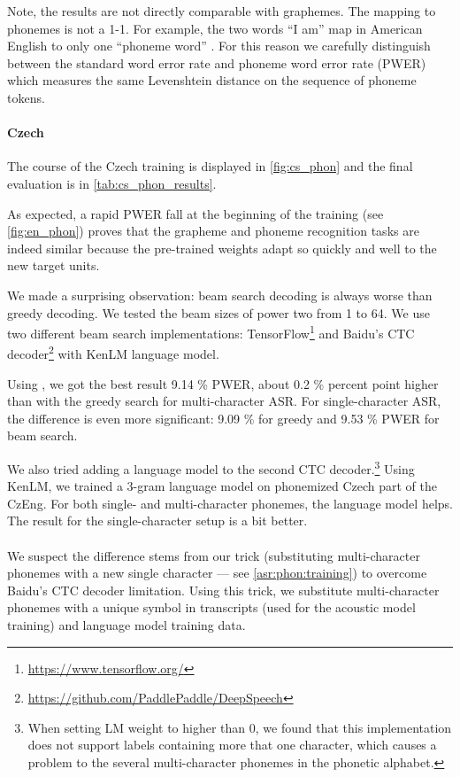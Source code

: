 Note, the results are not directly comparable with graphemes. The mapping to phonemes is not a 1-1. For example, the two words ``I am'' map in American English to only one ``phoneme word'' \textipa{[aI\ae m]}. For this reason we carefully distinguish between the standard word error rate and phoneme word error rate (PWER) which measures the same Levenshtein distance on the sequence of phoneme tokens.

\paragraph{Czech}
The course of the Czech training is displayed in \cref{fig:cs_phon} and the final evaluation is in \cref{tab:cs_phon_results}. 

As expected, a rapid PWER fall at the beginning of the training (see \cref{fig:en_phon}) proves that the grapheme and phoneme recognition tasks are indeed similar because the pre-trained weights adapt so quickly and well to the new target units.

We made a surprising observation: beam search decoding is always worse than greedy decoding. We tested the beam sizes of power two from 1 to 64. We use two different beam search implementations: TensorFlow\footnote{\url{https://www.tensorflow.org/}}  and Baidu's CTC decoder\footnote{\url{https://github.com/PaddlePaddle/DeepSpeech}} with KenLM \citep{Heafield-kenlm} language model. 

Using , we got the best result 9.14 \% PWER, about 0.2 \% percent point higher than with the greedy search for multi-character ASR. For single-character ASR, the difference is even more significant: 9.09 \% for greedy and 9.53 \% PWER for beam search. 

We also tried adding a language model to the second CTC decoder.\footnote{When setting LM weight to higher than 0, we found that this implementation does not support labels containing more that one character, which causes a problem to the several multi-character phonemes in the phonetic alphabet.} Using KenLM, we trained a 3-gram language model on phonemized Czech part of the CzEng. For both single- and multi-character phonemes, the language model helps. The result for the single-character setup is a bit better. 

\paragraph{}
We suspect the difference stems from our trick (substituting multi-character phonemes with a new single character --- see \cref{asr:phon:training}) to overcome Baidu's CTC decoder limitation. Using this trick, we substitute multi-character phonemes with a unique symbol in transcripts (used for the acoustic model training) and language model training data.

